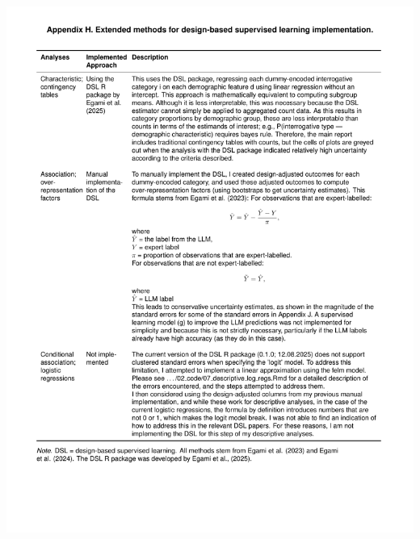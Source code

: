 \documentclass[
  12pt,
]{article}
\begin{document}
\begin{center}\includegraphics{../03_outputs/04_appendices/appendix_h} \end{center}
\end{document}
